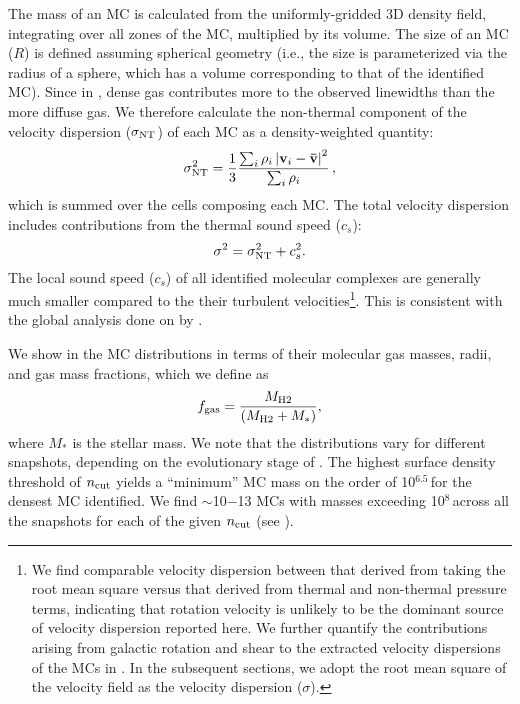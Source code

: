 \IfFileExists{emulateapjlegacy.cls}{\documentclass[iop]{emulateapjlegacy}}{\documentclass[iop]{emulateapj}}
\newcommand{\AP}[1]{({\bf \color{apcolor} AP: #1})}
\begin{document}
The mass of an MC is calculated from the uniformly-gridded 3D density field,
integrating over all zones of the MC, multiplied by its volume. 
The size of an MC ($R$) is defined assuming spherical geometry (i.e., 
the size is parameterized via the radius of a sphere, which has a volume corresponding to that of the identified MC).
Since in \obs, dense gas contributes more to the observed linewidths than the more diffuse gas. We therefore calculate 
the non-thermal component of the velocity dispersion ($\sigma_{\rm NT}$) of each MC as a density-weighted quantity:
\begin{equation}
\sigma_{\rm NT}^2 = \frac{1}{{3}}\frac{\sum_{i} \rho_i \left|\mathbf{v}_i - \mathbf{\bar v}\right|^2}{\sum_i \rho_i}\,,
\end{equation}
which is summed over the cells composing each MC.
The total velocity dispersion includes contributions from the thermal sound speed ($c_s$):
\begin{equation}
\sigma^2 = \sigma_{\rm NT}^2 + c_s^2.
\end{equation}
The local sound speed ($c_s$)
of all identified molecular complexes are generally much smaller compared to the their
turbulent velocities\footnote{We find comparable velocity dispersion between that derived from 
taking the root mean square versus that derived from thermal and non-thermal pressure terms, indicating that
rotation velocity is unlikely to be the dominant source of velocity dispersion reported here.
We further quantify the contributions arising from galactic rotation and shear to the extracted velocity dispersions of the MCs in .
In the subsequent sections, we adopt the root mean square of the velocity field
as the velocity dispersion ($\sigma$).}.
This is consistent with the global analysis done on \flower by \citet{Vallini18a}.


We show in  the MC distributions in terms of their
molecular gas masses, radii, and gas mass fractions, which we define as 
\begin{equation}
f_{\rm gas} = \frac{M_{\rm H2}} {\left(M_{\rm H2} + M_*\right)},
\end{equation}
where $M_*$ is the stellar mass.
We note that the distributions vary for different snapshots, depending on the evolutionary stage of \flower.
The highest surface density threshold of $n_{\rm cut}$ yields a ``minimum'' MC mass on
the order of 10$^{6.5}$\,\Msun for the densest MC identified. 
We find $\sim$10$-$13 MCs with masses exceeding 10$^8$\,\Msun across all the
snapshots for each of the given $n_{\rm cut}$ (see ).
\end{document}
